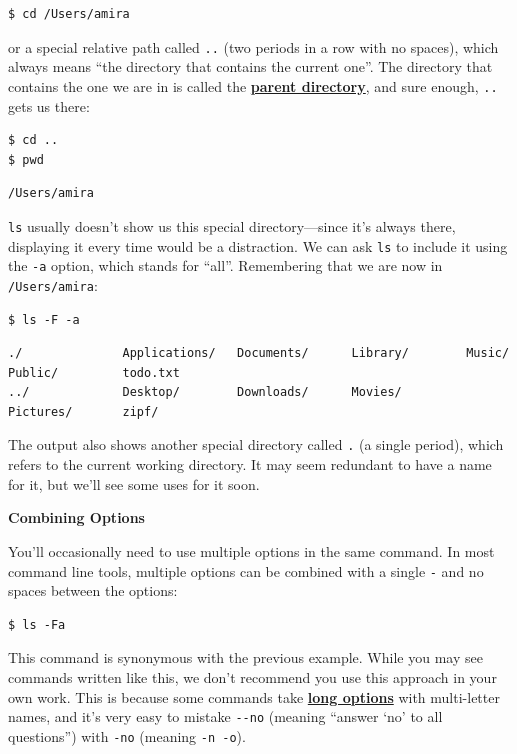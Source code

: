 \documentclass[
]{krantz}
\renewenvironment{quote}{\begin{VF}}{\end{VF}}
\newcommand{\gref}[2]{\hyperlink{#2}{\textbf{#1}}}
\begin{document}
\begin{verbatim}
$ cd /Users/amira
\end{verbatim}

or a special relative path called \texttt{..} (two periods in a row with no spaces),
which always means ``the directory that contains the current one''.
The directory that contains the one we are in is called the \gref{parent directory}{parent\_directory},
and sure enough,
\texttt{..} gets us there:

\begin{verbatim}
$ cd ..
$ pwd
\end{verbatim}

\begin{verbatim}
/Users/amira
\end{verbatim}

\texttt{ls} usually doesn't show us this special directory---since it's always there,
displaying it every time would be a distraction.
We can ask \texttt{ls} to include it using the \texttt{-a} option,
which stands for ``all''.
Remembering that we are now in \texttt{/Users/amira}:

\begin{verbatim}
$ ls -F -a
\end{verbatim}

\begin{verbatim}
./              Applications/   Documents/      Library/        Music/          Public/         todo.txt
../             Desktop/        Downloads/      Movies/         Pictures/       zipf/
\end{verbatim}

The output also shows another special directory called \texttt{.} (a single period),
which refers to the current working directory.
It may seem redundant to have a name for it,
but we'll see some uses for it soon.

\begin{quote}
\textbf{Combining Options}

You'll occasionally need to use multiple options in the same command.
In most command line tools,
multiple options can be combined with a single \texttt{-}
and no spaces between the options:

\begin{verbatim}
$ ls -Fa
\end{verbatim}

This command is synonymous with the previous example.
While you may see commands written like this,
we don't recommend you use this approach in your own work.
This is because some commands take \gref{long options}{long\_option}
with multi-letter names,
and it's very easy to mistake \texttt{-\/-no} (meaning ``answer `no' to all questions'')
with \texttt{-no} (meaning \texttt{-n\ -o}).
\end{quote}
\end{document}
